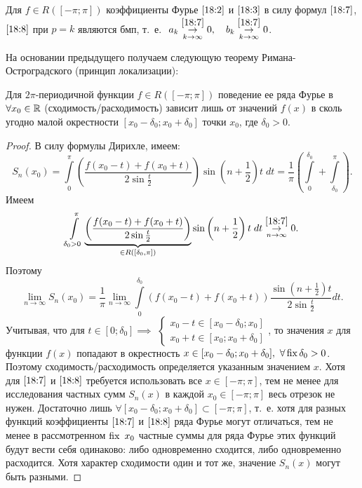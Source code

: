 \documentclass[../../main.tex]{subfiles}
\begin{document}
\begin{crl*}
	Для $f \in R([-\pi; \pi])$ коэффициенты Фурье $\eqref{18:2}$ и
	$\eqref{18:3}$ в силу формул $\eqref{18:7}$, $\eqref{18:8}$ при
	$p=k$ являются бмп, т.~е.
	$\ a_k \overset{\eqref{18:7}}{\underset
		{k \rightarrow \infty}{\rightarrow}} 0, \quad
	b_k \overset{\eqref{18:7}}{\underset
		{k \rightarrow \infty}{\rightarrow}} 0$.
\end{crl*}

\begin{rem}
	На основании предыдущего получаем следующую теорему 
	Римана-Остроградского (принцип локализации):
\end{rem}

\begin{thm}
	Для $2\pi$-периодичной функции $f\in R([-\pi;\pi])$ поведение
	ее ряда Фурье в $\forall x_0 \in \mathbb{R}$ (сходимость/расходимость) зависит
	лишь от значений $f(x)$ в сколь угодно малой окрестности
	$[x_0 - \delta_0; x_0 + \delta_0]$ точки $x_0$, где $\delta_0 > 0$.
\end{thm}

\begin{proof}
	В силу формулы Дирихле, имеем:
	\[S_n(x_0) = 
	\int\limits_{0}^{\pi}\left(\dfrac{f(x_0 - t) + f(x_0 + t)}
	{2\sin{\frac{t}{2}}}\right)\sin\left(n+\frac{1}{2}\right)t\;dt = 
	\dfrac{1}{\pi}\left(\int\limits_{0}^{\delta_0} + 
	\int\limits_{\delta_0}^{\pi}\right).\]
	Имеем
	\[\int\limits_{\delta_0 > 0}^{\pi} \underbrace{\left(\dfrac{f(x_0 - t) + 
	f(x_0 + t)}
	{2\sin{\frac{t}{2}}}\right)}_{\in R([\delta_0, \pi])} 
	\sin\left(n+\frac{1}{2}\right)t\;dt 
	 \overset{\eqref{18:7}}{\underset
		{n \rightarrow \infty}{\rightarrow}} 0.\]
	Поэтому
	\[\lim\limits_{n \rightarrow \infty}{S_n(x_0)} = \dfrac{1}{\pi}
	\lim\limits_{n \rightarrow \infty}{\int\limits_{0}^{\delta_0}
	(f(x_0 - t) + f(x_0 + t)) \dfrac{\sin(n+\frac{1}{2})t}{
	2\sin\frac{t}{2}}}dt.\]
	Учитывая, что для $t \in [0; \delta_0 ] \implies$
	$\begin{cases}
		x_0 - t \in [x_0 - \delta_0; x_0] 
		\\
		x_0 + t \in [x_0; x_0 + \delta_0] 
	\end{cases}$,
	то значения $x$ для функции $f(x)$
	попадают в окрестность
	 $x \in [x_0 - \delta_0; x_0 + \delta_0],\ \forall \operatorname{fix} \delta_0 > 0$.
	 Поэтому сходимость/расходимость определяется указанным значением $x$.
	 Хотя для $\eqref{18:7}$ и $\eqref{18:8}$ требуется использовать все
	 $x \in [-\pi; \pi]$, тем не менее для исследования частных сумм 
	 $S_n(x)$ в каждой $x_0 \in [-\pi; \pi]$ весь отрезок не нужен.
	 Достаточно лишь $\forall [x_0 - \delta_0; x_0 + \delta_0] \subset
	 [-\pi; \pi]$, т.~е. хотя для разных функций коэффициенты 
	 $\eqref{18:7}$ и $\eqref{18:8}$ ряда Фурье могут отличаться, 
	 тем не менее в рассмотренном $\operatorname{fix}\ x_0$ частные суммы для
	 ряда Фурье
	 этих функций будут вести себя одинаково: либо одновременно сходится, 
	 либо одновременно расходится.
	 Хотя характер сходимости один и тот же, значение $S_n(x)$ могут быть
	 разными.
\end{proof}
\end{document}
